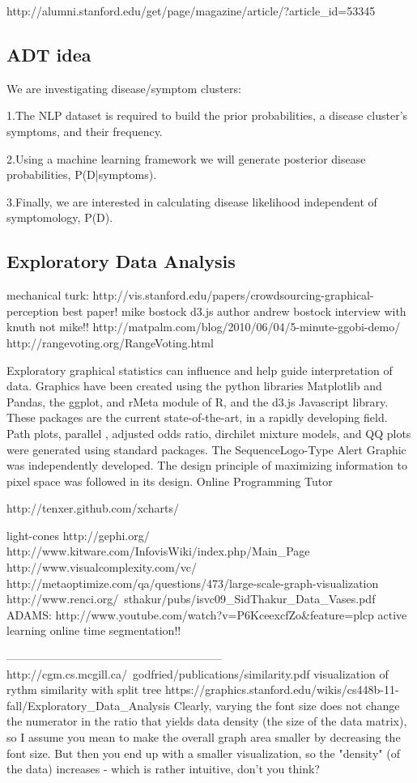 \documentclass[12pt]{article}
\begin{document}
http://alumni.stanford.edu/get/page/magazine/article/?article_id=53345

\subsection*{ADT idea}

We are investigating disease/symptom clusters:

1.The NLP dataset is required to build the prior probabilities, a disease cluster's symptoms, and their frequency.

2.Using a machine learning framework we will generate posterior disease probabilities, P(D|symptoms).

3.Finally, we are interested in calculating disease likelihood independent of symptomology, P(D).



\subsection*{Exploratory Data Analysis }
mechanical turk:
http://vis.stanford.edu/papers/crowdsourcing-graphical-perception
best paper! mike bostock d3.js author
andrew bostock interview with knuth not mike!!
http://matpalm.com/blog/2010/06/04/5-minute-ggobi-demo/
http://rangevoting.org/RangeVoting.html

Exploratory graphical statistics can influence and help guide interpretation of data.  Graphics have been created using the python libraries Matplotlib and Pandas, the ggplot, and rMeta module of R, and the d3.js Javascript library.  These packages are the current state-of-the-art, in a rapidly developing field.  Path plots, parallel , adjusted odds ratio, dirchilet mixture models, and QQ plots were generated using standard packages.  The SequenceLogo-Type Alert Graphic was independently developed.  The design principle of maximizing information to pixel space was followed in its design.
Online Programming Tutor

http://tenxer.github.com/xcharts/

light-cones
http://gephi.org/
http://www.kitware.com/InfovisWiki/index.php/Main_Page
http://www.visualcomplexity.com/vc/
http://metaoptimize.com/qa/questions/473/large-scale-graph-visualization
http://www.renci.org/~sthakur/pubs/isvc09_SidThakur_Data_Vases.pdf
ADAMS:
http://www.youtube.com/watch?v=P6KceexcfZo&feature=plcp
active learning online time segmentation!!

---------------------------------------------------------
http://cgm.cs.mcgill.ca/~godfried/publications/similarity.pdf
visualization of rythm similarity with split tree
https://graphics.stanford.edu/wikis/cs448b-11-fall/Exploratory_Data_Analysis
Clearly, varying the font size does not change the numerator in the ratio that yields data density (the size of the data matrix), so I assume you mean to make the overall graph area smaller by decreasing the font size. But then you end up with a smaller visualization, so the "density" (of the data) increases - which is rather intuitive, don't you think?
\end{document}
